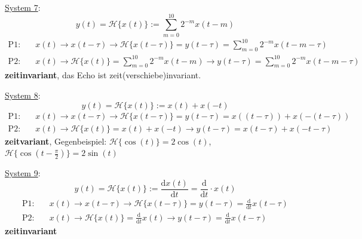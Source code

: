 \documentclass[11pt,a4paper,DIV=12]{scrartcl}
\numberwithin{equation}{section}
\numberwithin{figure}{section}
\newcommand\fsd{\mathrm{d}} %
\newcommand{\sysH}[1]{\mathcal{H}{\{#1\}}}
\begin{document}
\begin{Loesung}
\item  \underline{System 7}:
\begin{equation}
y(t) = \sysH{x(t)}:= \sum_{m=0}^{10} 2^{-m} x(t-m)
\end{equation}
\begin{align}
\text{P1:}& \quad x(t)\rightarrow x(t-\tau)\rightarrow \mathcal{H}\{x(t-\tau)\}=y(t-\tau)=\sum_{m=0}^{10} 2^{-m} x(t-m-\tau)\\
\text{P2:}& \quad x(t)\rightarrow \mathcal{H}\{x(t)\}=\sum_{m=0}^{10} 2^{-m} x(t-m)\rightarrow y(t-\tau) = \sum_{m=0}^{10} 2^{-m} x(t-m-\tau)
\end{align}
\textbf{zeitinvariant}, das Echo ist zeit(verschiebe)invariant.

\item  \underline{System 8}:
\begin{equation}
y(t) = \sysH{x(t)}:= x(t) + x(-t)
\end{equation}
\begin{align}
\text{P1:}& \quad x(t)\rightarrow x(t-\tau)\rightarrow \mathcal{H}\{x(t-\tau)\}=y(t-\tau) = x((t-\tau)) + x(-(t-\tau))\\
\text{P2:}& \quad x(t)\rightarrow \mathcal{H}\{x(t)\}=x(t) + x(-t)\rightarrow y(t-\tau)=x(t-\tau) + x(-t-\tau)
\end{align}
\textbf{zeitvariant}, Gegenbeispiel: $\sysH{\cos(t)}=2\cos(t)$, $\sysH{\cos(t-\frac{\pi}{2})}=2\sin(t)$

\item  \underline{System 9}:
\begin{equation}
y(t) = \sysH{x(t)}:= \frac{\fsd x(t)}{\fsd t} = \frac{\fsd}{\fsd t} \cdot x(t)
\end{equation}
\begin{align}
\text{P1:}& \quad x(t)\rightarrow x(t-\tau)\rightarrow \mathcal{H}\{x(t-\tau)\}=y(t-\tau)=\frac{\fsd}{\fsd t} x(t-\tau)\\
\text{P2:}& \quad x(t)\rightarrow \mathcal{H}\{x(t)\}=\frac{\fsd}{\fsd t}  x(t)\rightarrow y(t-\tau)=\frac{\fsd}{\fsd t}  x(t-\tau)
\end{align}
\textbf{zeitinvariant}


\end{Loesung}
\end{document}
